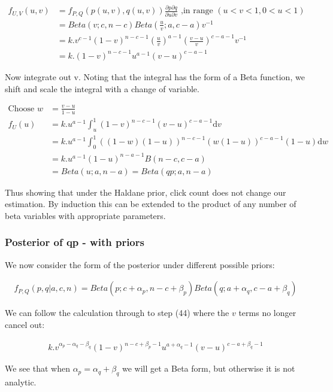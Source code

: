 \documentclass[12pt]{article}
\begin{document}
\begin{align}
 f_{U,V}(u,v) &= f_{P,Q}(p(u,v),q(u,v)) 
		\frac{\partial p \partial q}{\partial u \partial v} 
		\text{ ,in range }  (u<v<1,0<u<1) \\
 &= Beta(v;c,n-c) Beta(\frac{u}{v};a,c-a) v^{-1} \\
 &= k . v^{c-1} (1-v)^{n-c-1} (\frac{u}{v})^{a-1} (\frac{v - u}{v})^{c-a-1} v^{-1} \\
 &= k . (1-v)^{n-c-1} u^{a-1} (v - u)^{c-a-1}
\end{align}

Now integrate out v. Noting that the integral has the form of a Beta function, we shift and scale the integral with a change of variable.

\begin{align}
\text{Choose }  w &= \frac{v-u}{1-u} \\
f_U(u) &= k.u^{a-1} \int_u^1 (1-v)^{n-c-1} (v - u)^{c-a-1} \mathrm{d}v \\
 &= k.u^{a-1} \int_0^1 ((1-w)(1-u))^{n-c-1} (w(1-u))^{c-a-1} (1-u) \mathrm{d}w \\
 &= k.u^{a-1} (1-u)^{n-a-1} B(n-c,c-a) \\
 &= Beta(u;a,n-a) = Beta(qp;a,n-a) 
\end{align}

Thus showing that under the Haldane prior, click count does not change our estimation. By induction this can be extended to the product of any number of beta variables with appropriate parameters.

\subsubsection{Posterior of qp - with priors}

We now consider the form of the posterior under different possible priors:

\begin{align}
 f_{P,Q}(p,q|a,c,n) = Beta(p;c+\alpha_p,n-c+\beta_p) Beta(q;a+\alpha_q,c-a+\beta_q)
\end{align}

We can follow the calculation through to step (44) where the $v$ terms no longer cancel out:

\begin{align}
 k . v^{\alpha_p - \alpha_q - \beta_q}(1-v)^{n-c+\beta_p-1} u^{a+\alpha_q-1} (v - u)^{c-a+\beta_q-1}
\end{align}

We see that when $ \alpha_p = \alpha_q + \beta_q $ we will get a Beta form, but otherwise it is not analytic. 
\end{document}
